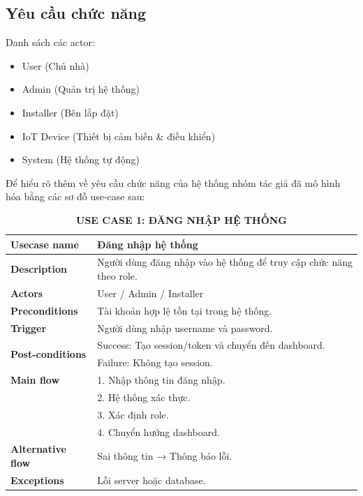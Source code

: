 \subsection{Yêu cầu chức năng}
Danh sách các actor:
\begin{itemize}
    \item User (Chủ nhà)
    \item Admin (Quản trị hệ thống)
    \item Installer (Bên lắp đặt)
    \item IoT Device (Thiết bị cảm biến \& điều khiển)
    \item System (Hệ thống tự động)

\end{itemize}
Để hiểu rõ thêm về yêu cầu chức năng của hệ thống nhóm tác giả đã mô hình hóa bằng các sơ đồ use-case sau:
\\

\begin{table}[H]
\centering
\captionsetup{justification=centering}
\caption*{\textbf{USE CASE 1: ĐĂNG NHẬP HỆ THỐNG}}
\renewcommand{\arraystretch}{1.3}
\begin{tabular}{|p{4cm}|p{11cm}|}
\hline
\textbf{Usecase name} & Đăng nhập hệ thống \\
\hline
\textbf{Description} & Người dùng đăng nhập vào hệ thống để truy cập chức năng theo role. \\
\hline
\textbf{Actors} & User / Admin / Installer \\
\hline
\textbf{Preconditions} & Tài khoản hợp lệ tồn tại trong hệ thống. \\
\hline
\textbf{Trigger} & Người dùng nhập username và password. \\
\hline
\multirow{2}{*}{\textbf{Post-conditions}} & 
Success: Tạo session/token và chuyển đến dashboard.\\ &
Failure: Không tạo session. \\
\hline
\textbf{Main flow} & 
1. Nhập thông tin đăng nhập.\\ &
2. Hệ thống xác thực.\\ &
3. Xác định role.\\ &
4. Chuyển hướng dashboard. \\
\hline
\textbf{Alternative flow} & Sai thông tin → Thông báo lỗi. \\
\hline
\textbf{Exceptions} & Lỗi server hoặc database. \\
\hline
\end{tabular}
\end{table}

